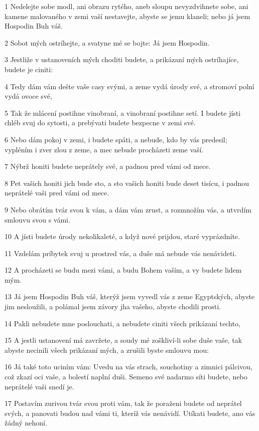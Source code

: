 \par 1 Nedelejte sobe modl, ani obrazu rytého, aneb sloupu nevyzdvihnete sobe, ani kamene malovaného v zemi vaší nestavejte, abyste se jemu klaneli; nebo já jsem Hospodin Buh váš.
\par 2 Sobot mých ostríhejte, a svatyne mé se bojte: Já jsem Hospodin.
\par 3 Jestliže v ustanoveních mých choditi budete, a prikázaní mých ostríhajíce, budete je ciniti:
\par 4 Tedy dám vám dešte vaše casy svými, a zeme vydá úrody své, a stromoví polní vydá ovoce své,
\par 5 Tak že mlácení postihne vinobraní, a vinobraní postihne setí. I budete jísti chléb svuj do sytosti, a prebývati budete bezpecne v zemi své.
\par 6 Nebo dám pokoj v zemi, i budete spáti, a nebude, kdo by vás predesil; vypléním i zver zlou z zeme, a mec nebude procházeti zeme vaší.
\par 7 Nýbrž honiti budete neprátely své, a padnou pred vámi od mece.
\par 8 Pet vašich honiti jich bude sto, a sto vašich honiti bude deset tisícu, i padnou neprátelé vaši pred vámi od mece.
\par 9 Nebo obrátím tvár svou k vám, a dám vám zrust, a rozmnožím vás, a utvrdím smlouvu svou s vámi.
\par 10 A jísti budete úrody nekolikaleté, a když nové prijdou, staré vyprázdníte.
\par 11 Vzdelám príbytek svuj u prostred vás, a duše má nebude vás nenávideti.
\par 12 A procházeti se budu mezi vámi, a budu Bohem vaším, a vy budete lidem mým.
\par 13 Já jsem Hospodin Buh váš, kterýž jsem vyvedl vás z zeme Egyptských, abyste jim nesloužili, a polámal jsem závory jha vašeho, abyste chodili prosti.
\par 14 Pakli nebudete mne poslouchati, a nebudete ciniti všech prikázaní techto,
\par 15 A jestli ustanovení má zavržete, a soudy mé zoškliví-li sobe duše vaše, tak abyste necinili všech prikázaní mých, a zrušili byste smlouvu mou:
\par 16 Já také toto uciním vám: Uvedu na vás strach, souchotiny a zimnici pálcivou, což zkazí oci vaše, a bolestí naplní duši. Semeno své nadarmo síti budete, nebo neprátelé vaši snedí je.
\par 17 Postavím zurivou tvár svou proti vám, tak že poraženi budete od neprátel svých, a panovati budou nad vámi ti, kteríž vás nenávidí. Utíkati budete, ano vás žádný nehoní.
